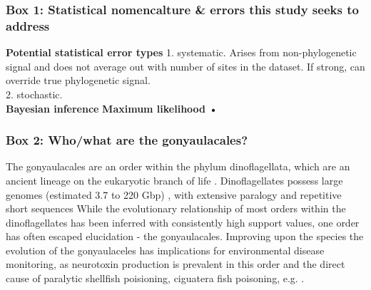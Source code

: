 \documentclass[12pt]{article}
\begin{document}
\subsubsection*{Box 1: Statistical nomencalture \& errors this study seeks to address}
\textbf{Potential statistical error types}
1. systematic. Arises from non-phylogenetic signal and does not average out with number of sites in the dataset. If strong, can override true phylogenetic signal.\\
2. stochastic.\\
\textbf{Bayesian inference}
\textbf{Maximum likelihood}
\textbf{•}

\subsubsection*{Box 2: Who/what are the gonyaulacales?}
The gonyaulacales are an order within the phylum dinoflagellata, which are an ancient lineage on the eukaryotic branch of life \cite{moldowan1998biogeochemical}. 
Dinoflagellates possess large genomes (estimated 3.7 to 220 Gbp) \cite{casabianca2017genome}, with extensive paralogy and repetitive short sequences %
While the evolutionary relationship of most orders within the dinoflagellates has been inferred with consistently high support values, one order has often escaped elucidation - the gonyaulacales. 
Improving upon the species the evolution of the gonyaulaceles has implications for environmental disease monitoring, as neurotoxin production is prevalent in this order and the direct cause of paralytic shellfish poisioning, ciguatera fish poisoning, e.g. \cite{shalchian2006combined,zhang2007three,saldarriaga2004molecular,hoppenrath2010dinoflagellate,murray2005improving}. 
\end{document}

